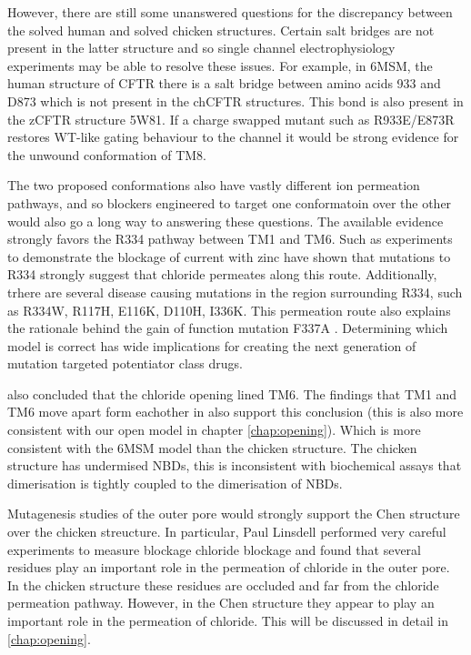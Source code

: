 However, there are still some unanswered questions for the discrepancy between the solved human and solved chicken structures. Certain salt bridges are not present in the latter structure and so single channel electrophysiology experiments may be able to resolve these issues. For example, in 6MSM, the human structure of CFTR there is a salt bridge between amino acids 933 and D873 which is not present in the chCFTR structures. This bond is also present in the zCFTR structure 5W81. If a charge swapped mutant such as R933E/E873R restores WT-like gating behaviour to the channel it would be  strong evidence for the unwound conformation of TM8. 

The two proposed conformations also have vastly different ion permeation pathways, and so blockers engineered to target one conformatoin over the other would also go a long way to answering these questions. The available evidence strongly favors the R334 pathway between TM1 and TM6. Such as experiments to  demonstrate the blockage of current with zinc have shown that mutations to R334 strongly suggest that chloride permeates along this route. Additionally, trhere are several disease causing mutations in the region surrounding R334, such as R334W, R117H, E116K, D110H, I336K\cite{cftr2}. This permeation route also explains the rationale behind the gain of function mutation F337A \cite{}. Determining which model is correct has wide implications for creating the next generation of mutation targeted potentiator class drugs.

\cite{gao2015} also concluded that the chloride opening lined TM6. The findings that TM1 and TM6 move apart form eachother in \cite{negoda2018} also support this conclusion (this is also more consistent with our open model in chapter \ref{chap:opening}). Which is more consistent with the 6MSM model than the chicken structure.
The chicken structure has undermised NBDs, this is inconsistent with biochemical assays that dimerisation is tightly coupled to the dimerisation of NBDs\cite{vergani2005, yeh2021}.

Mutagenesis studies of the outer pore would strongly support the Chen structure over the chicken streucture. In particular, Paul Linsdell performed very careful experiments to measure blockage chloride blockage and found that several residues play an important role in the permeation of chloride in the outer pore. In the chicken structure these residues are occluded and far from the chloride permeation pathway. However, in the Chen structure they appear to play an important role in the permeation of chloride. This will be discussed in detail in \ref{chap:opening}.

